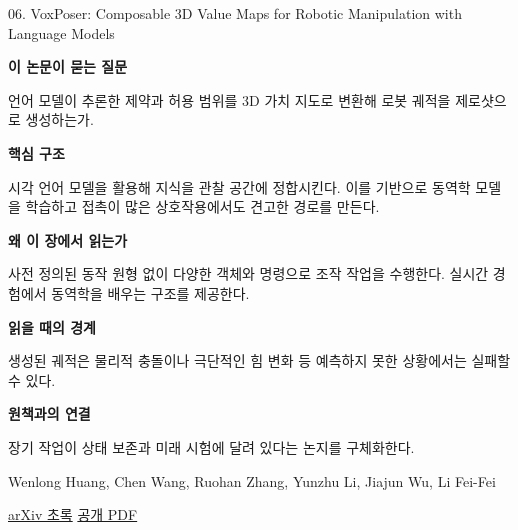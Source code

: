 \documentclass[11pt,openany]{book}
\begin{document}
\begin{termcard}{06. VoxPoser: Composable 3D Value Maps for Robotic Manipulation with Language Models}

\par

\medskip

{\sffamily\bfseries\color{deepblue} 이 논문이 묻는 질문}\par

언어 모델이 추론한 제약과 허용 범위를 3D 가치 지도로 변환해 로봇 궤적을 제로샷으로 생성하는가.

\smallskip

{\sffamily\bfseries\color{deepblue} 핵심 구조}\par

시각 언어 모델을 활용해 지식을 관찰 공간에 정합시킨다. 이를 기반으로 동역학 모델을 학습하고 접촉이 많은 상호작용에서도 견고한 경로를 만든다.

\smallskip

{\sffamily\bfseries\color{deepblue} 왜 이 장에서 읽는가}\par

사전 정의된 동작 원형 없이 다양한 객체와 명령으로 조작 작업을 수행한다. 실시간 경험에서 동역학을 배우는 구조를 제공한다.

\smallskip

{\sffamily\bfseries\color{coral} 읽을 때의 경계}\par

생성된 궤적은 물리적 충돌이나 극단적인 힘 변화 등 예측하지 못한 상황에서는 실패할 수 있다.

\smallskip

{\sffamily\bfseries\color{teal} 원책과의 연결}\par

장기 작업이 상태 보존과 미래 시험에 달려 있다는 논지를 구체화한다.

\medskip

{\footnotesize\color{muted} Wenlong Huang, Chen Wang, Ruohan Zhang, Yunzhu Li, Jiajun Wu, Li Fei-Fei\par

\href{https://arxiv.org/abs/2307.05973}{arXiv 초록} \quad \href{https://arxiv.org/pdf/2307.05973}{공개 PDF}\par}

\end{termcard}
\end{document}
